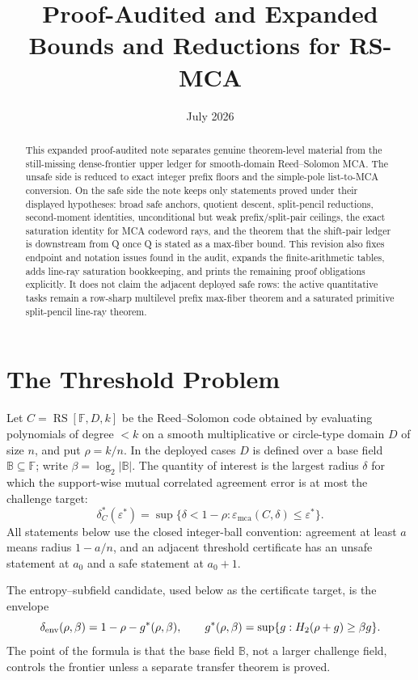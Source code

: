 \documentclass[a4paper,11pt]{amsart}
\title{Proof-Audited and Expanded Bounds and Reductions for RS-MCA}
\date{July 2026}
\theoremstyle{remark}
\newcommand{\F}{\mathbb F}
\newcommand{\B}{\mathbb B}
\newcommand{\RS}{\operatorname{RS}}
\newcommand{\emca}{\varepsilon_{\mathrm{mca}}}
\newcommand{\Htwo}{H_2}
\begin{document}
\begin{abstract}
This expanded proof-audited note separates genuine theorem-level material from the still-missing dense-frontier upper ledger for smooth-domain Reed--Solomon MCA.  The unsafe side is reduced to exact integer prefix floors and the simple-pole list-to-MCA conversion.  On the safe side the note keeps only statements proved under their displayed hypotheses: broad safe anchors, quotient descent, split-pencil reductions, second-moment identities, unconditional but weak prefix/split-pair ceilings, the exact saturation identity for MCA codeword rays, and the theorem that the shift-pair ledger is downstream from Q once Q is stated as a max-fiber bound.  This revision also fixes endpoint and notation issues found in the audit, expands the finite-arithmetic tables, adds line-ray saturation bookkeeping, and prints the remaining proof obligations explicitly.  It does not claim the adjacent deployed safe rows: the active quantitative tasks remain a row-sharp multilevel prefix max-fiber theorem and a saturated primitive split-pencil line-ray theorem.
\end{abstract}

\maketitle




\section{The Threshold Problem}

Let \(C=\RS[\F,D,k]\) be the Reed--Solomon code obtained by evaluating polynomials of degree \(<k\) on a smooth multiplicative or circle-type domain \(D\) of size \(n\), and put \(\rho=k/n\).  In the deployed cases \(D\) is defined over a base field \(\B\subseteq\F\); write \(\beta=\log_2|\B|\).  The quantity of interest is the largest radius \(\delta\) for which the support-wise mutual correlated agreement error is at most the challenge target:
\[
        \delta_C^*(\varepsilon^*)=\sup\{\delta<1-\rho:\emca(C,\delta)\le\varepsilon^*\}.
\]
All statements below use the closed integer-ball convention: agreement at least \(a\) means radius \(1-a/n\), and an adjacent threshold certificate has an unsafe statement at \(a_0\) and a safe statement at \(a_0+1\).

The entropy--subfield candidate, used below as the certificate target, is the envelope
\[
        \delta_{\rm env}(\rho,\beta)=1-\rho-g^*(\rho,\beta),
        \qquad
        g^*(\rho,\beta)=\sup\{g:\Htwo(\rho+g)\ge \beta g\}.
\]
The point of the formula is that the base field \(\B\), not a larger challenge field, controls the frontier unless a separate transfer theorem is proved.
\end{document}
